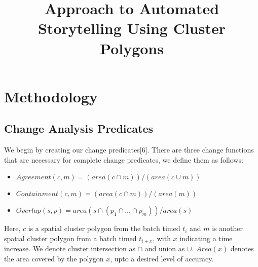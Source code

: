 \documentclass[conference]{IEEEtran}
\begin{document}
\title{Approach to Automated Storytelling Using Cluster Polygons}
\author{
\and
{}
}
\maketitle

\section{Methodology}


\subsection{Change Analysis Predicates}

We begin by creating our change predicates[6]. There are three change functions that are necessary for complete change predicates, we define them as follows:

\begin{itemize}
	\item $Agreement (c, m) = (area(c\cap m))/(area(c\cup m))$
	\item $Containment (c, m) = (area(c\cap m))/(area(m))$
	\item $Overlap(s,p)= area(s\cap (p_1\cap …\cap p_m))/area(s)$

\end{itemize}

Here, $c$ is a spatial cluster polygon from the batch timed $t_i$ and $m$ is another spatial cluster polygon from a batch timed $t_{i+x}$, with $x$ indicating a time increase. We denote cluster intersection as $\cap$ and union as $\cup$. $Area(x)$ denotes the area covered by the polygon $x$, upto a desired level of accuracy.
\end{document}
